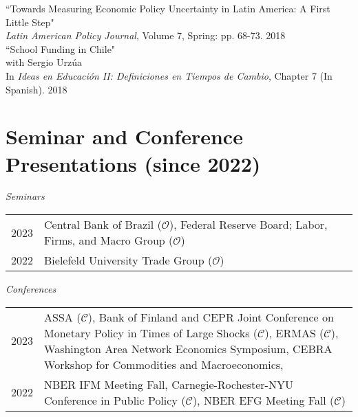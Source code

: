 \documentclass[10pt]{article}
\begin{document}
\noindent ``Towards Measuring Economic Policy Uncertainty in Latin America: A First Little Step" \\
\indent \textit{Latin American Policy Journal}, Volume 7, Spring: pp. 68-73. 2018\\[-0.125in]

\noindent ``School Funding in Chile"\\
\indent with Sergio Urz\'ua \\
\indent In  \textit{Ideas en Educaci\'on II: Definiciones en Tiempos de Cambio}, Chapter 7 (In Spanish). 2018

\section*{Seminar and Conference Presentations (since 2022)}

\noindent 
\emph{Seminars}\\[0.1in]
\begin{small}
\begin{tabular}{@{}lp{15.5cm}}
2023& Central Bank of Brazil ($\mathcal{O}$), Federal Reserve Board; Labor, Firms, and Macro Group ($\mathcal{O}$)\\
2022& Bielefeld University Trade Group ($\mathcal{O}$)%
\end{tabular}
\end{small}

\noindent \emph{Conferences}\\[0.1in]
\begin{small}
\begin{tabular}{@{}lp{15.5cm}}
2023& ASSA ($\mathcal{C}$), Bank of Finland and CEPR Joint Conference on Monetary Policy in Times of Large Shocks ($\mathcal{C}$), ERMAS ($\mathcal{C}$), Washington Area Network Economics Symposium, CEBRA Workshop for Commodities and Macroeconomics, \\
2022& NBER IFM Meeting Fall, Carnegie-Rochester-NYU Conference in Public Policy ($\mathcal{C}$), NBER EFG Meeting Fall ($\mathcal{C}$)
\end{tabular}
\end{small}
\end{document}
